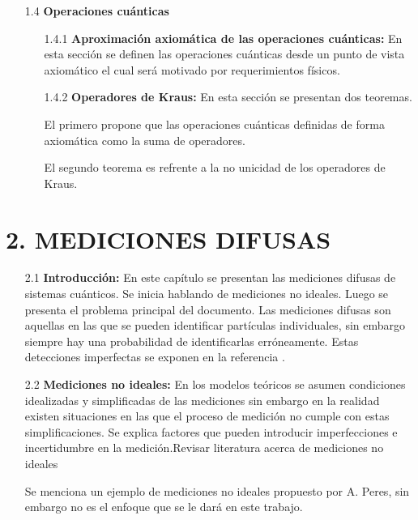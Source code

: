 \documentclass[12pt,oneside]{book}\raggedbottom{} %
\begin{document}
\begin{sloppypar}
{{\begin{itemize}
\begin{itemize}
  En estos casos es importante estudiar las medidas POVM\@. Se define las medidas POVM y se mencionan varias razones por las que  estos operadores son de utilidad.
\end{itemize}
\item[1.4]\textbf{Operaciones cuánticas}
\begin{itemize}
  \item[1.4.1] \textbf{Aproximación axiomática de las operaciones cuánticas:} En esta sección se definen las operaciones cuánticas desde un punto de vista
 axiomático el cual será motivado por requerimientos físicos. 
  \item[1.4.2] \textbf{Operadores de Kraus: }En esta sección se presentan dos teoremas.
  
  El primero propone que las operaciones cuánticas definidas de forma axiomática como la suma de operadores.
  
  El segundo teorema es refrente a la no unicidad de los operadores de Kraus.
\end{itemize}
\end{itemize}

\section*{2. MEDICIONES DIFUSAS}
  \begin{itemize}
    \item[2.1]\textbf{Introducción:}
 En este capítulo se presentan las mediciones difusas de sistemas cuánticos. Se inicia hablando de mediciones no ideales. Luego se presenta el problema principal del documento. Las mediciones difusas son aquellas en las que se pueden identificar partículas individuales, sin embargo siempre hay una probabilidad de identificarlas erróneamente. Estas detecciones imperfectas se exponen en la referencia {\cite{Pineda_2021}}.



  \item[2.2]\textbf{Mediciones no ideales:}  En los modelos teóricos se asumen condiciones idealizadas y simplificadas de las mediciones sin embargo en la realidad existen situaciones en las que el proceso de medición no cumple con estas simplificaciones. Se explica factores que pueden introducir imperfecciones e incertidumbre en la medición.Revisar literatura acerca de mediciones no ideales

  Se menciona un ejemplo de mediciones no ideales propuesto por A. Peres,  sin embargo no es el enfoque que se le dará en este trabajo.


\end{itemize}}}
\end{sloppypar}
\end{document}
